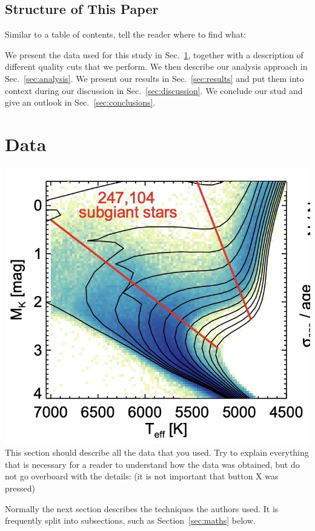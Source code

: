 \documentclass[fleqn,usenatbib]{mnras}
\begin{document}
\subsection{Structure of This Paper} \label{sec:intro_structure}

Similar to a table of contents, tell the reader where to find what:

We present the data used for this study in Sec.~\ref{sec:data}, together with a description of different quality cuts that we perform. We then describe our analysis approach in Sec.~\ref{sec:analysis}. We present our results in Sec.~\ref{sec:results} and put them into context during our discussion in Sec.~\ref{sec:discussion}. We conclude our stud and give an outlook in Sec.~\ref{sec:conclusions}.

\section{Data} \label{sec:data}
\includegraphics[scale=0.3]{Image 11-3-2024 at 1.09 pm 2}
This section should describe all the data that you used. Try to explain everything that is necessary for a reader to understand how the data was obtained, but do not go overboard with the details:  (it is not important that button X was pressed)

Normally the next section describes the techniques the authors used.
It is frequently split into subsections, such as Section~\ref{sec:maths} below.
\end{document}
